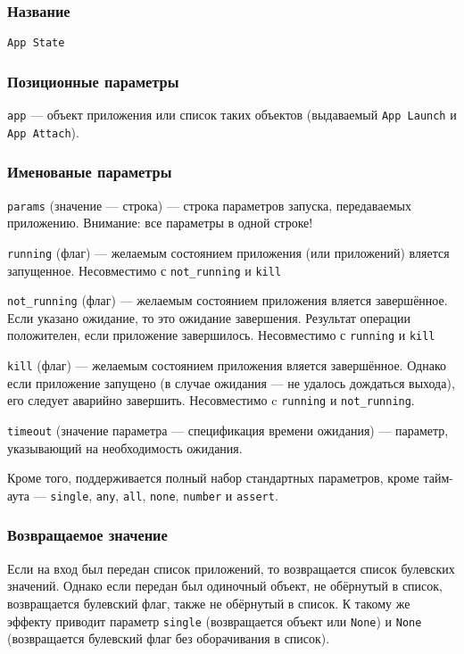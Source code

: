 \documentclass[11pt]{book} %
\begin{document}
\subsubsection*{Название} 
\verb"App State"

\subsubsection*{Позиционные параметры} 

\verb"app" --- объект приложения или список таких объектов (выдаваемый \verb"App Launch" и \verb"App Attach").

\subsubsection*{Именованые параметры} 
\verb"params" (значение --- строка) --- строка параметров запуска, передаваемых приложению. Внимание: все параметры в одной строке!

\verb"running" (флаг) --- желаемым состоянием приложения (или приложений) вляется запущенное. Несовместимо с \verb"not_running" и \verb"kill"

\verb"not_running" (флаг) --- желаемым состоянием приложения вляется завершённое. Если указано ожидание, то это ожидание завершения. Результат операции положителен, если приложение завершилось. Несовместимо с \verb"running" и \verb"kill"

\verb"kill" (флаг) --- желаемым состоянием приложения вляется завершённое. Однако если приложение запущено (в случае ожидания --- не удалось дождаться выхода), его следует аварийно завершить. Несовместимо c \verb"running" и \verb"not_running".

\verb"timeout" (значение параметра --- спецификация времени ожидания) --- параметр, указывающий на необходимость ожидания.

Кроме того, поддерживается полный набор стандартных параметров, кроме тайм-аута --- \verb"single", \verb|any|, \verb|all|, \verb|none|, \verb|number| и \verb"assert". 


\subsubsection*{Возвращаемое значение}

Если на вход был передан список приложений, то возвращается список булевских значений. Однако если передан был одиночный объект, не обёрнутый в список, возвращается булевский флаг, также не обёрнутый в список. К такому же эффекту приводит параметр \verb|single| (возвращается объект или \verb|None|) и \verb|None| (возвращается булевский флаг без оборачивания в список).
\end{document}
